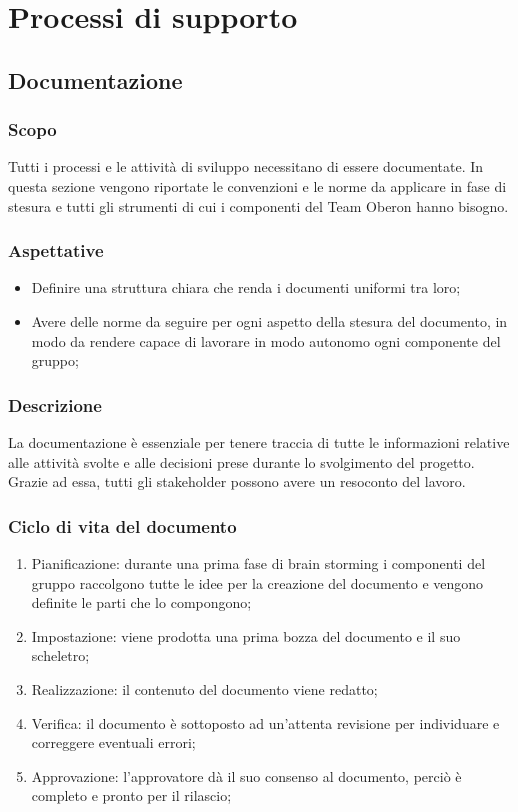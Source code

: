 \section{Processi di supporto}
\subsection{Documentazione}

\subsubsection{Scopo}
Tutti i processi e le attività di sviluppo necessitano di essere documentate. In questa sezione vengono riportate le convenzioni e le norme da applicare in fase di stesura e tutti gli strumenti di cui i componenti del Team Oberon hanno bisogno.
\subsubsection{Aspettative}
\begin{itemize}
    \item Definire una struttura chiara che renda i documenti uniformi tra loro;
    \item Avere delle norme da seguire per ogni aspetto della stesura del documento, in modo da rendere capace di lavorare in modo autonomo ogni componente del gruppo;
\end{itemize}
\subsubsection{Descrizione}
La documentazione è essenziale per tenere traccia di tutte le informazioni relative alle attività svolte e alle decisioni prese durante lo svolgimento del progetto. Grazie ad essa, tutti gli stakeholder possono avere un resoconto del lavoro.
\subsubsection{Ciclo di vita del documento}
\begin{enumerate}
    \item Pianificazione: durante una prima fase di brain storming i componenti del gruppo raccolgono tutte le idee per la creazione del documento e vengono definite le parti che lo compongono;
    \item Impostazione: viene prodotta una prima bozza del documento e il suo scheletro;
    \item Realizzazione: il contenuto del documento viene redatto;
    \item Verifica: il documento è sottoposto ad un’attenta revisione per individuare e correggere eventuali errori;
    \item Approvazione: l’approvatore dà il suo consenso al documento, perciò è completo e pronto per il rilascio;
\end{enumerate}

